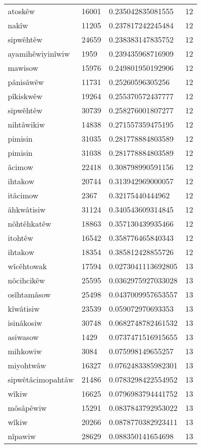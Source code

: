 \begin{longtable}{llll}
atoskêw & 16001 & 0.235042835081555 & 12 \\
nakîw & 11205 & 0.237817242245484 & 12 \\
sipwêhtêw & 24659 & 0.238383147835752 & 12 \\
ayamihêwiyinîwiw & 1959 & 0.239435968716909 & 12 \\
mawisow & 15976 & 0.249801950192906 & 12 \\
pânisâwêw & 11731 & 0.25260596305256 & 12 \\
pîkiskwêw & 19264 & 0.255370572437777 & 12 \\
sipwêhtêw & 30739 & 0.258276001807277 & 12 \\
nihtâwikiw & 14838 & 0.271557359475195 & 12 \\
pimisin & 31035 & 0.281778884803589 & 12 \\
pimisin & 31038 & 0.281778884803589 & 12 \\
âcimow & 22418 & 0.308798990591156 & 12 \\
ihtakow & 20744 & 0.313942969000057 & 12 \\
itâcimow & 2367 & 0.32175440444962 & 12 \\
âhkwâtisiw & 31124 & 0.340543609314845 & 12 \\
nôhtêhkatêw & 18863 & 0.357130439935466 & 12 \\
itohtêw & 16542 & 0.358776465840343 & 12 \\
ihtakow & 18354 & 0.385812428855726 & 12 \\
wîcêhtowak & 17594 & 0.0273041113692805 & 13 \\
nôcihcikêw & 25595 & 0.0362975927033028 & 13 \\
osîhtamâsow & 25498 & 0.0437009957653557 & 13 \\
kîwâtisiw & 23539 & 0.059072970693353 & 13 \\
isinâkosiw & 30748 & 0.0682748782461532 & 13 \\
asiwasow & 1429 & 0.0737471516915655 & 13 \\
mihkowiw & 3084 & 0.075998149655257 & 13 \\
miyohtwâw & 16327 & 0.0762483385982301 & 13 \\
sipwêtâcimopahtâw & 21486 & 0.0783298422554952 & 13 \\
wîkiw & 16625 & 0.0796983794441752 & 13 \\
môsâpêwiw & 15291 & 0.0837843792953022 & 13 \\
wîkiw & 20266 & 0.0878770382923411 & 13 \\
nîpawiw & 28629 & 0.088350141654698 & 13 \\

\end{longtable}
